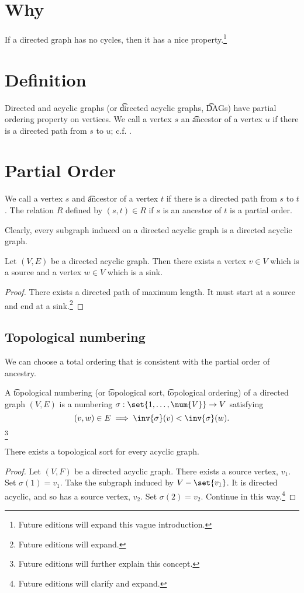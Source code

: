 
\section*{Why}

If a directed graph has no cycles, then it has a nice property.\footnote{Future editions will expand this vague introduction.}

\section*{Definition}

Directed and acyclic graphs (or \t{directed acyclic graphs}, \t{DAGs}) have partial ordering property on vertices.
We call a vertex $s$ an \t{ancestor} of a vertex $u$ if there is a directed path from $s$ to $u$; c.f. .

\section*{Partial Order}

We call a vertex $s$ and \t{ancestor} of a vertex $t$ if there is a directed path from $s$ to $t$.
The relation $R$ defined by $(s, t) \in R$ if $s$ is an ancestor of $t$ is a partial order.

Clearly, every subgraph induced on a directed acyclic graph is a directed acyclic graph.

\begin{proposition}
Let $(V, E)$ be a directed acyclic graph. Then there exists a vertex $v \in V$ which is a source and a vertex $w \in V$ which is a sink.
\begin{proof}There exists a directed path of maximum length. It must start at a source and end at a sink.\footnote{Future editions will expand.}\end{proof}
\end{proposition}

\subsection*{Topological numbering}

We can choose a total ordering that is consistent with the partial order of ancestry.

A \t{topological numbering} (or \t{topological sort}, \t{topological ordering}) of a directed graph $(V, E)$ is a numbering $\sigma : \set{1, \dots , \num{V}} \to V$ satisfying
\[
(v, w) \in E \implies \inv{\sigma }(v) < \inv{\sigma }(w).
\]\footnote{Future editions will further explain this concept.}

\begin{proposition}
There exists a topological sort for every acyclic graph.
\end{proposition}

\begin{proof}Let $(V, F)$ be a directed acyclic graph.
There exists a source vertex, $v_1$.
Set $\sigma (1) = v_1$.
Take the subgraph induced by $V - \set{v_1}$.
It is directed acyclic, and so has a source vertex, $v_2$.
Set $\sigma (2) = v_2$.
Continue in this way.\footnote{Future editions will clarify and expand.}\end{proof}
\blankpage